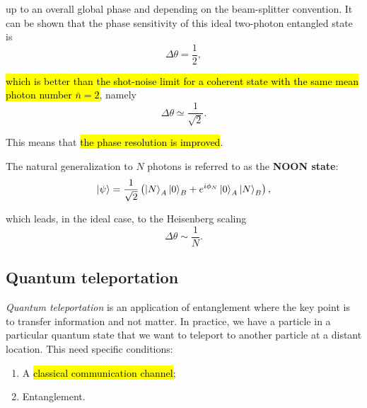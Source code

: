 up to an overall global phase and depending on the beam-splitter convention. It can be shown that the phase sensitivity of this ideal two-photon entangled state is
\begin{equation}\label{eqn:16-phase-sensitivity}
\Delta\theta = \frac{1}{2},
\end{equation}

\hl{which is better than the shot-noise limit for a coherent state with the same mean photon number $\bar n = 2$}, namely
\begin{equation}\label{eqn:16-shot-noise-limit-2}
\Delta\theta \simeq \frac{1}{\sqrt{2}}.
\end{equation}

This means that \hl{the phase resolution is improved}. 


The natural generalization to $N$ photons is referred to as the \textbf{NOON state}:
\begin{equation}\label{eqn:16-noon-state}
\ket{\psi}=\frac{1}{\sqrt{2}}\left(\ket{N}_A\ket{0}_B+e^{i\phi_N}\ket{0}_A\ket{N}_B\right),
\end{equation}

which leads, in the ideal case, to the Heisenberg scaling
\begin{equation}\label{eqn:16-heisenberg-scaling}
\Delta\theta \sim \frac{1}{N}.
\end{equation}


\subsection{Quantum teleportation}

\emph{Quantum teleportation} is an application of entanglement where the key point is to transfer information and not matter. In practice, we have a particle in a particular quantum state that we want to teleport to another particle at a distant location. This need specific conditions:
\begin{enumerate}
    \item A \hl{classical communication channel};
    \item Entanglement.
\end{enumerate}

